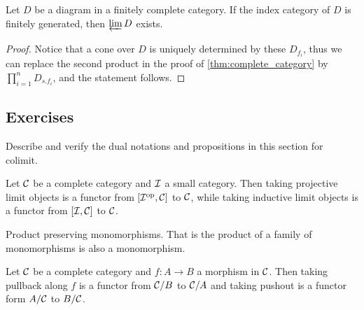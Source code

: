   \begin{prop}\label{prop:finitely generated limits}
    Let $D$ be a diagram in a finitely complete category. If the index category of $D$ is finitely generated, then $\operatorname*{\underleftarrow{\lim}} D$ exists.
  \end{prop}
  \begin{proof}
    Notice that a cone over $D$ is uniquely determined by these $D_{f_i}$, thus we can replace the second product in the proof of \ref{thm:complete_category} by $\prod\limits_{i=1}^n D_{s.f_i}$, and the statement follows.
  \end{proof}

\subsection{Exercises}
  \begin{ex}
    Describe and verify the dual notations and propositions in this section for colimit.
  \end{ex}
  \begin{ex}
    Let ${\cal C}$ be a complete category and ${\cal I}$ a small category. Then taking projective limit objects is a functor from $[{\cal I}^{\operatorname{op}},{\cal C}]$ to ${\cal C}$, while taking inductive limit objects is a functor from $[{\cal I},{\cal C}]$ to ${\cal C}$.
  \end{ex}
  \begin{ex}
    Product preserving monomorphisms. That is the product of a family of monomorphisms is also a monomorphism.
  \end{ex}
  \begin{ex}
    Let ${\cal C}$ be a complete category and $f\colon A\to B$ a morphism in ${\cal C}$. Then taking pullback along $f$ is a functor from ${\cal C}/B$ to ${\cal C}/A$ and taking pushout is a functor form $A/{\cal C}$ to $B/{\cal C}$.
  \end{ex}


